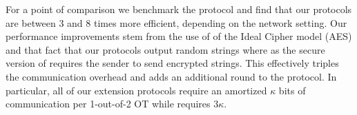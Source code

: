 For a point of comparison we benchmark the \cite{C:KelOrsSch15} protocol and find that our protocols are between 3 and 8 times more efficient, depending on the network setting. Our performance improvements stem from the use of of the Ideal Cipher model (AES) and that fact that our protocols output random strings where as the secure version of \cite{C:KelOrsSch15} requires the sender to send encrypted strings. This effectively triples the communication overhead and adds an additional round to the protocol. In particular, all of our extension protocols require an amortized $\kappa$ bits of communication per 1-out-of-2 OT while \cite{C:KelOrsSch15} requires $3\kappa$.